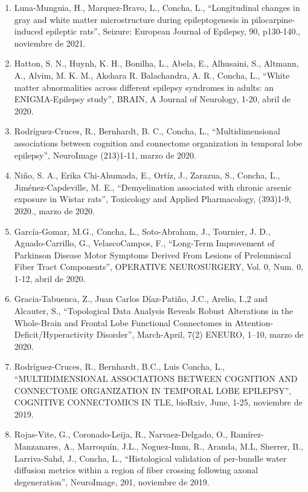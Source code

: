 \begin{enumerate}
\item Luna-Munguia, H., Marquez-Bravo, L., Concha, L., “Longitudinal changes in gray and white matter microstructure during epileptogenesis in 
pilocarpine-induced 
epileptic rats”, Seizure: European Journal of Epilepsy, 90, p130-140.,  noviembre de 2021.

\item Hatton, S. N., Huynh, K. H., Bonilha, L., Abela, E., Alhusaini, S., Altmann, A., Alvim, M. K. M., Akshara R. Balachandra, A. R., Concha, L., “White matter 
abnormalities across different epilepsy syndromes in adults: an ENIGMA-Epilepsy study”, BRAIN, A Journal of Neurology, 1-20,  abril de 2020.

\item Rodríguez-Cruces, R., Bernhardt, B. C., Concha, L., “Multidimensional associations between cognition and connectome organization in temporal lobe 
epilepsy”, 
NeuroImage (213)1-11,  marzo de 2020.

\item Niño, S. A., Erika Chi-Ahumada, E., Ortíz, J., Zarazua, S., Concha, L., Jiménez-Capdeville, M. E., “Demyelination associated with chronic arsenic exposure 
in Wistar rats”, Toxicology and Applied Pharmacology, (393)1-9, 2020.,  marzo de 2020.

\item García-Gomar, M.G., Concha, L., Soto-Abraham, J., Tournier, J. D., Aguado-Carrillo, G., VelascoCampos, F., “Long-Term Improvement of Parkinson Disease 
Motor 
Symptoms Derived From Lesions of Prelemniscal Fiber Tract Components”, OPERATIVE NEUROSURGERY, Vol. 0, Num. 0, 1-12,  abril de 2020.

\item Gracia-Tabuenca, Z., Juan Carlos Díaz-Patiño, J.C., Arelio, I.,2 and Alcauter, S., “Topological Data Analysis Reveals Robust Alterations in the Whole-Brain 
and Frontal Lobe Functional Connectomes in Attention-Deficit/Hyperactivity Disorder”, March-April, 7(2) ENEURO, 1–10,  marzo de 2020.

\item Rodríguez-Cruces, R., Bernhardt, B.C., Luis Concha, L., “MULTIDIMENSIONAL ASSOCIATIONS BETWEEN COGNITION AND CONNECTOME ORGANIZATION IN TEMPORAL LOBE 
EPILEPSY”, COGNITIVE CONNECTOMICS IN TLE, bioRxiv, June, 1-25,  noviembre de 2019.

\item Rojas-Vite, G., Coronado-Leija, R., Narvaez-Delgado, O., Ramírez-Manzanares, A., Marroquín, J.L., Noguez-Imm, R., Aranda, M.L, Sherrer, B., Larriva-Sahd, 
J., Concha, L., “Histological validation of per-bundle water diffusion metrics within a region of fiber crossing following axonal degeneration”, NeuroImage, 
201,  noviembre de 2019.


\end{enumerate}
